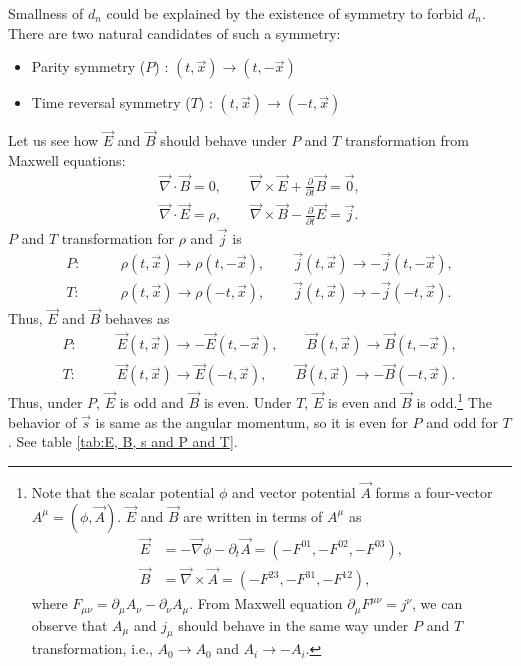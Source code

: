 \documentclass[11pt,a4paper]{article}
\begin{document}
Smallness of $d_n$ could be explained by the existence of symmetry to forbid $d_n$.
There are two natural candidates of such a symmetry:
\begin{itemize}
\item Parity symmetry ($P$) : $(t,\vec x) \to (t,-\vec x)$
\item Time reversal symmetry ($T$) : $(t,\vec x) \to (-t,\vec x)$
\end{itemize}
Let us see how $\vec E$ and $\vec B$ should behave under $P$ and $T$ transformation from Maxwell equations:
\begin{align}
    \vec\nabla \cdot \vec B = 0, \qquad
    \vec\nabla \times \vec E + \frac{\partial}{\partial t}\vec B = \vec 0, \\
    \vec\nabla \cdot \vec E = \rho, \qquad
    \vec\nabla \times \vec B - \frac{\partial}{\partial t}\vec E = \vec j.
\end{align}
$P$ and $T$ transformation for $\rho$ and $\vec j$ is
\begin{align}
    P :&\qquad \rho(t,\vec x) \to \rho(t,-\vec x), \qquad
    \vec j(t,\vec x) \to -\vec j(t,-\vec x), \\
    T :&\qquad \rho(t,\vec x) \to \rho(-t,\vec x), \qquad
    \vec j(t,\vec x) \to -\vec j(-t,\vec x).
\end{align}
Thus, $\vec E$ and $\vec B$ behaves as
\begin{align}
    P :&\qquad \vec E(t,\vec x) \to -\vec E(t,-\vec x), \qquad
    \vec B(t,\vec x) \to \vec B(t,-\vec x), \\
    T :&\qquad \vec E(t,\vec x) \to \vec E(-t,\vec x), \qquad
    \vec B(t,\vec x) \to -\vec B(-t,\vec x).
\end{align}
Thus, under $P$, $\vec E$ is odd and $\vec B$ is even. Under $T$, $\vec E$ is even and $\vec B$ is odd.\footnote{
Note that the scalar potential $\phi$ and vector potential $\vec A$ forms a four-vector $A^\mu = (\phi, \vec A)$. $\vec E$ and $\vec B$ are written in terms of $A^\mu$ as
\begin{align}
    \vec E &= -\vec\nabla \phi - \partial_t \vec A
    = (-F^{01}, -F^{02}, -F^{03}),\\
    \vec B &= \vec\nabla \times \vec A
    = (-F^{23}, -F^{31}, -F^{12}),
\end{align}
where $F_{\mu\nu} = \partial_\mu A_\nu - \partial_\nu A_\mu$. From Maxwell equation $\partial_\mu F^{\mu\nu} = j^\nu$, we can observe that $A_\mu$ and $j_\mu$ should behave in the same way under $P$ and $T$ transformation, i.e., $A_0 \to A_0$ and $A_i \to -A_i$.}
The behavior of $\vec s$ is same as the angular momentum, so it is even for $P$ and odd for $T$.
See table \ref{tab:E, B, s and P and T}.
\end{document}
